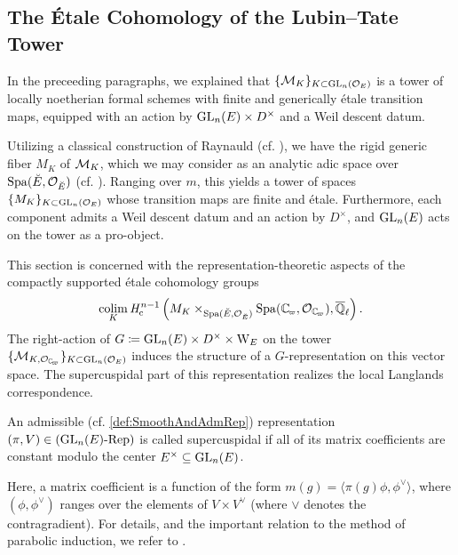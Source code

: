 \documentclass[../main.tex]{subfiles}
\begin{document}


\subsection{The \'Etale Cohomology of the Lubin--Tate Tower} %
\label{sub:The Local Langlands Correspondence for the General Linear Group}
In the preceeding paragraphs, we explained that $\{\mathcal{M}_{K}\}_{K \subset
\operatorname{GL}_n(\mathcal{O}_E)}$ is a 
tower of locally noetherian formal schemes with finite and generically \'etale 
transition maps, equipped with an action by $\operatorname{GL}_n(E) \times D^\times$ and 
a Weil descent datum. 

Utilizing a classical construction of Raynauld (cf. \cite{raynaud1974geometrie}),
we have the rigid generic fiber $M_{K}$ of $\mathcal{M}_{K}$, 
which we may consider as an analytic adic space over $\operatorname{Spa}({\breve {E}},\mathcal{O}_{\breve {E}})$ 
(cf. \cite[Section 1.9]{huber2013etale}). 
Ranging over $m$, this yields a tower of spaces $\{M_{K}\}_{K \subset
\operatorname{GL}_n(\mathcal{O}_E)}$ whose transition maps are finite and \'etale. Furthermore, each
component admits a Weil descent datum and an action by $D^\times$, and $\operatorname{GL}_n(E)$
acts on the tower as a pro-object.

This section is concerned with the representation-theoretic aspects of
the compactly supported \'etale cohomology groups
\begin{equation*}
  \colim_K \hHc^{n-1} \left(M_{K} \times_{\spa({\br E,\cO_\br E})} \Spa(\Cp, \cO_\Cp),
  \bar \Q_\ell\right).
\end{equation*}
The right-action of $G \coloneqq \operatorname{GL}_n(E) \times D^\times \times \mathrm W_E$ on the tower
$\{\cM_{K, \cO_\Cp}\}_{K \subset \GL_n(\cO_E)}$ induces the structure of a
$G$-representation on this vector space. 
The supercuspidal part of this representation realizes the local Langlands
correspondence. 

\begin{defi}\label{def:SuperCusp}
  An admissible (cf. \cref{def:SmoothAndAdmRep}) representation $(\pi,V) \in
  {({\operatorname{GL}_n(E)}\textnormal-\allowbreak\mathrm{Rep})}$ is called supercuspidal if all of its matrix coefficients are
  constant modulo the center $E^\times \subseteq \operatorname{GL}_n(E)$.
\end{defi}

Here, a matrix coefficient is a function of the form $m(g) = \langle \pi(g)
\phi, \phi^\vee\rangle$, where $(\phi, \phi^\vee)$ ranges over the elements of
$V \times V^\vee$ (where $\vee$ denotes the contragradient). For details, and
the important relation to the method of parabolic induction, we refer to
\cite[Section 8]{getz2023introduction}.
\end{document}
